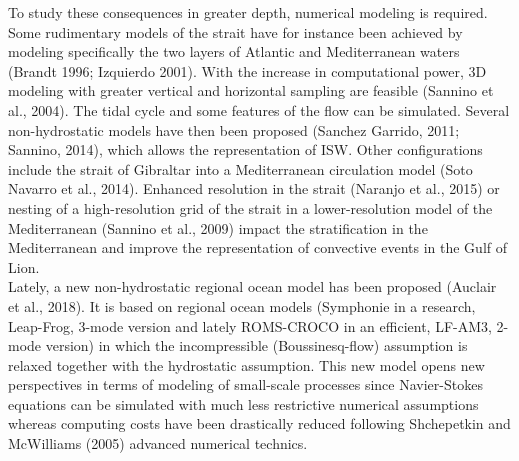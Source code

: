 \documentclass[a4paper,12pt]{article}
\begin{document}
To study these consequences in greater depth, numerical modeling is required. Some rudimentary models of the strait have for instance been achieved by modeling specifically the two layers of Atlantic and Mediterranean waters (Brandt 1996; Izquierdo 2001). With the increase in computational power, 3D modeling with greater vertical and horizontal sampling are feasible (Sannino et al., 2004). The tidal cycle and some features of the flow can be simulated. Several non-hydrostatic models have then been proposed (Sanchez Garrido, 2011; Sannino, 2014), which allows the representation of ISW. Other configurations include the strait of Gibraltar into a Mediterranean circulation model (Soto Navarro et al., 2014). Enhanced resolution in the strait (Naranjo et al., 2015) or nesting of a high-resolution grid of the strait in a lower-resolution model of the Mediterranean (Sannino et al., 2009) impact the stratification in the Mediterranean and improve the representation of convective events in the Gulf of Lion.\\
Lately, a new non-hydrostatic regional ocean model has been proposed (Auclair et al., 2018). It is based on regional ocean models (Symphonie in a research, Leap-Frog, 3-mode version and lately ROMS-CROCO in an efficient, LF-AM3, 2-mode version) in which the incompressible (Boussinesq-flow) assumption is relaxed together with the hydrostatic assumption. This new model opens new perspectives in terms of modeling of small-scale processes since Navier-Stokes equations can be simulated with much less restrictive numerical assumptions whereas computing costs have been drastically reduced following Shchepetkin and McWilliams (2005) advanced numerical technics.\\

\end{document}

